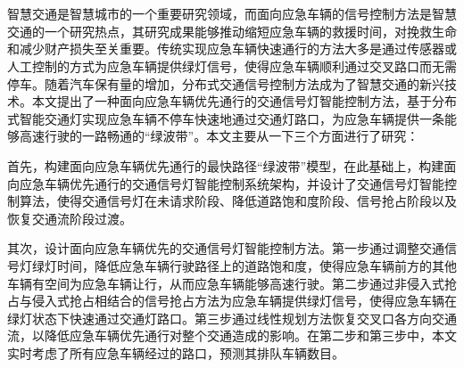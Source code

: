 \vspace{-2.5cm}
\chapter*{}
\vspace{-1cm}

\setlength{\baselineskip}{25pt}
智慧交通是智慧城市的一个重要研究领域，而面向应急车辆的信号控制方法是智慧交通的一个研究热点，其研究成果能够推动缩短应急车辆的救援时间，对挽救生命和减少财产损失至关重要。传统实现应急车辆快速通行的方法大多是通过传感器或人工控制的方式为应急车辆提供绿灯信号，使得应急车辆顺利通过交叉路口而无需停车。随着汽车保有量的增加，分布式交通信号控制方法成为了智慧交通的新兴技术。本文提出了一种面向应急车辆优先通行的交通信号灯智能控制方法，基于分布式智能交通灯实现应急车辆不停车快速地通过交通灯路口，为应急车辆提供一条能够高速行驶的一路畅通的“绿波带”。本文主要从一下三个方面进行了研究：



首先，构建面向应急车辆优先通行的最快路径“绿波带”模型，在此基础上，构建面向应急车辆优先通行的交通信号灯智能控制系统架构，并设计了交通信号灯智能控制算法，使得交通信号灯在未请求阶段、降低道路饱和度阶段、信号抢占阶段以及恢复交通流阶段过渡。

其次，设计面向应急车辆优先的交通信号灯智能控制方法。第一步通过调整交通信号灯绿灯时间，降低应急车辆行驶路径上的道路饱和度，使得应急车辆前方的其他车辆有空间为应急车辆让行，从而应急车辆能够高速行驶。第二步通过非侵入式抢占与侵入式抢占相结合的信号抢占方法为应急车辆提供绿灯信号，使得应急车辆在绿灯状态下快速通过交通灯路口。第三步通过线性规划方法恢复交叉口各方向交通流，以降低应急车辆优先通行对整个交通造成的影响。在第二步和第三步中，本文实时考虑了所有应急车辆经过的路口，预测其排队车辆数目。

